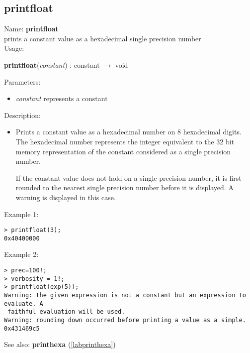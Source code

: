\subsection{printfloat}
\label{labprintfloat}
\noindent Name: \textbf{printfloat}\\
prints a constant value as a hexadecimal single precision number\\
\noindent Usage: 
\begin{center}
\textbf{printfloat}(\emph{constant}) : \textsf{constant} $\rightarrow$ \textsf{void}
\\ 
\end{center}
Parameters: 
\begin{itemize}
\item \emph{constant} represents a constant
\end{itemize}
\noindent Description: \begin{itemize}

\item Prints a constant value as a hexadecimal number on 8 hexadecimal
   digits. The hexadecimal number represents the integer equivalent to
   the 32 bit memory representation of the constant considered as a
   single precision number.
    
   If the constant value does not hold on a single precision number, it
   is first rounded to the nearest single precision number before it is
   displayed. A warning is displayed in this case.
\end{itemize}
\noindent Example 1: 
\begin{center}\begin{minipage}{15cm}\begin{Verbatim}[frame=single]
> printfloat(3);
0x40400000
\end{Verbatim}
\end{minipage}\end{center}
\noindent Example 2: 
\begin{center}\begin{minipage}{15cm}\begin{Verbatim}[frame=single]
> prec=100!;
> verbosity = 1!;
> printfloat(exp(5));
Warning: the given expression is not a constant but an expression to evaluate. A
 faithful evaluation will be used.
Warning: rounding down occurred before printing a value as a simple.
0x431469c5
\end{Verbatim}
\end{minipage}\end{center}
See also: \textbf{printhexa} (\ref{labprinthexa})
